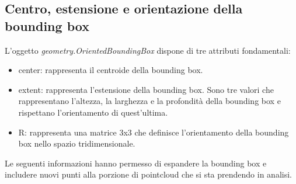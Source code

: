 \documentclass[italian]{report}
\begin{document}
\subsection{Centro, estensione e orientazione della bounding box}
L'oggetto \textit{geometry.OrientedBoundingBox} dispone di tre attributi fondamentali:
\begin{itemize}
	\item center: rappresenta il centroide della bounding box.
	\item extent: rappresenta l'estensione della bounding box. Sono tre valori che rappresentano l'altezza, la larghezza e la profondità della bounding box e rispettano l'orientamento di quest'ultima.
	\item R: rappresenta una matrice 3x3 che definisce l'orientamento della bounding box nello spazio tridimensionale.
\end{itemize}
Le seguenti informazioni hanno permesso di espandere la bounding box e includere nuovi punti alla porzione di pointcloud che si sta prendendo in analisi.
\end{document}
